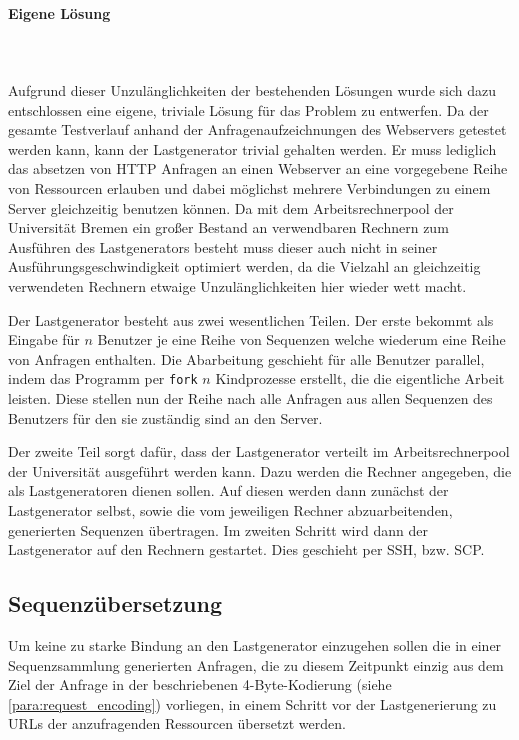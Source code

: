 \documentclass[10pt]{scrartcl}
\begin{document}
  \paragraph{Eigene Lösung}
  ~\\
  ~\\
  \label{para:load_generator_custom_solution}
    Aufgrund dieser Unzulänglichkeiten der bestehenden Lösungen wurde sich dazu entschlossen eine eigene, triviale Lösung für das Problem zu entwerfen. Da der gesamte Testverlauf anhand der Anfragenaufzeichnungen des Webservers getestet werden kann, kann der Lastgenerator trivial gehalten werden. Er muss lediglich das absetzen von HTTP Anfragen an einen Webserver an eine vorgegebene Reihe von Ressourcen erlauben und dabei möglichst mehrere Verbindungen zu einem Server gleichzeitig benutzen können. Da mit dem Arbeitsrechnerpool der Universität Bremen ein großer Bestand an verwendbaren Rechnern zum Ausführen des Lastgenerators besteht muss dieser auch nicht in seiner Ausführungsgeschwindigkeit optimiert werden, da die Vielzahl an gleichzeitig verwendeten Rechnern etwaige Unzulänglichkeiten hier wieder wett macht.
    
    Der Lastgenerator besteht aus zwei wesentlichen Teilen. Der erste bekommt als Eingabe für $n$ Benutzer je eine Reihe von Sequenzen welche wiederum eine Reihe von Anfragen enthalten. Die Abarbeitung geschieht für alle Benutzer parallel, indem das Programm per \verb|fork| $n$ Kindprozesse erstellt, die die eigentliche Arbeit leisten. Diese stellen nun der Reihe nach alle Anfragen aus allen Sequenzen des Benutzers für den sie zuständig sind an den Server.
    
    Der zweite Teil sorgt dafür, dass der Lastgenerator verteilt im Arbeitsrechnerpool der Universität ausgeführt werden kann. Dazu werden die Rechner angegeben, die als Lastgeneratoren dienen sollen. Auf diesen werden dann zunächst der Lastgenerator selbst, sowie die vom jeweiligen Rechner abzuarbeitenden, generierten Sequenzen übertragen. Im zweiten Schritt wird dann der Lastgenerator auf den Rechnern gestartet. Dies geschieht per SSH, bzw. SCP.
    
  \subsection{Sequenzübersetzung}
  Um keine zu starke Bindung an den Lastgenerator einzugehen sollen die in einer Sequenzsammlung generierten Anfragen, die zu diesem Zeitpunkt einzig aus dem Ziel der Anfrage in der beschriebenen 4-Byte-Kodierung (siehe \ref{para:request_encoding}) vorliegen, in einem Schritt vor der Lastgenerierung zu URLs der anzufragenden Ressourcen übersetzt werden.
  
\end{document}
